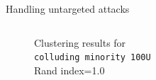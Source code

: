 \begin{frame}{Handling untargeted attacks}
\begin{columns}
\begin{column}{.4\textwidth}
\begin{figure}
{            \caption*{Clustering results for\\ \texttt{colluding minority 100U}\\ 
            Rand index=1.0
            }
        }
      \end{figure}
    \end{column}
  \begin{column}{.6\textwidth}

\begin{table}
    \centering


\end{table}
\end{column}
\end{columns}
\end{frame}

